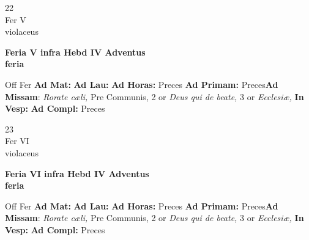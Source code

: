 \documentclass[10pt, openany]{book}
\begin{document}
        \begin{center}
            \begin{minipage}{3.5in}
                \vspace{2em}
                \begin{minipage}{0.5in}
                    {\Huge 22} \\
                    {\normalsize Fer V} \\
                    {\normalsize violaceus}
                \end{minipage}
                \begin{minipage}{3.0in}
                    \textbf{ \large Feria V infra Hebd IV Adventus \\
                    \textnormal{\normalsize feria}} \\ 
                \end{minipage}
                \begin{justify}Off Fer
                    \textbf{Ad Mat: }
                    \textbf{Ad Lau: }
                    \textbf{Ad Horas: }Preces
                    \textbf{Ad Primam: }Preces\textbf{Ad Missam}: \textit{Rorate cæli,} Pre Communis, 2 or \textit{Deus qui de beate,} 3 or \textit{Ecclesiæ,}  
                    \textbf{In Vesp: }
                    \textbf{Ad Compl: }Preces
                \end{justify}
            \end{minipage}
        \end{center}
    
        \begin{center}
            \begin{minipage}{3.5in}
                \vspace{2em}
                \begin{minipage}{0.5in}
                    {\Huge 23} \\
                    {\normalsize Fer VI} \\
                    {\normalsize violaceus}
                \end{minipage}
                \begin{minipage}{3.0in}
                    \textbf{ \large Feria VI infra Hebd IV Adventus \\
                    \textnormal{\normalsize feria}} \\ 
                \end{minipage}
                \begin{justify}Off Fer
                    \textbf{Ad Mat: }
                    \textbf{Ad Lau: }
                    \textbf{Ad Horas: }Preces
                    \textbf{Ad Primam: }Preces\textbf{Ad Missam}: \textit{Rorate cæli,} Pre Communis, 2 or \textit{Deus qui de beate,} 3 or \textit{Ecclesiæ,}  
                    \textbf{In Vesp: }
                    \textbf{Ad Compl: }Preces
                \end{justify}
            \end{minipage}
        \end{center}
    
\end{document}
